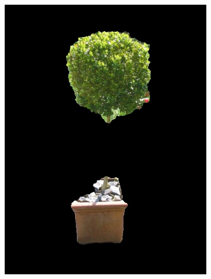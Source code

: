 \documentclass[a4paper,11]{article}
\begin{document}
\begin{center}
\begin{figure}[H]
\begin{subfigure}{.33\textwidth}
    \end{subfigure}
    \begin{subfigure}{0.33\textwidth}
      \centering
      \includegraphics[width=0.9\linewidth]{results/bush}
    \end{subfigure}\\
    \vspace{1em}
    

\end{figure}
\end{center}
\end{document}
